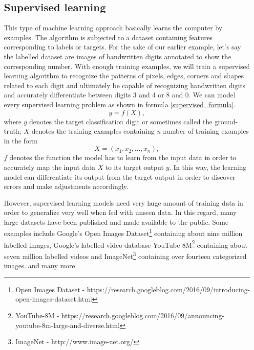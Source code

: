 \documentclass[master]{thesis-uestc}
\begin{document}
\subsection{Supervised learning}
This type of machine learning approach basically learns the computer by examples. The algorithm is subjected to a dataset containing features corresponding to labels or targets. For the sake of our earlier example, let's say the labelled dataset are images of handwritten digits annotated to show the corresponding number. With enough training examples, we will train a supervised learning algorithm to recognize the patterns of pixels, edges, corners and shapes related to each digit and ultimately be capable of recognizing handwritten digits and accurately differentiate between digits 3 and 4 or 8 and 0. We can model every supervised learning problem as shown in formula \ref{supervised_formula}.
\begin{equation}
y = f (X),
\label{supervised_formula}
\end{equation}
where $y$ denotes the target classification digit or sometimes called the ground-truth; $X$ denotes the training examples containing \textit{n} number of training examples in the form
\begin{equation}
X = (x_1, x_2,...,x_n),
\end{equation}
$f$ denotes the function the model has to learn from the input data in order to accurately map the input data $X$ to its target output $y$. In this way, the learning model can differentiate its output from the target output in order to discover errors and make adjustments accordingly.

However, supervised learning models need very huge amount of training data in order to generalize very well when fed with unseen data. In this regard, many large datasets have been published and made available to the public. Some examples include Google's Open Images Dataset\footnote{Open Images Dataset - https://research.googleblog.com/2016/09/introducing-open-images-dataset.html} containing about nine million labelled images, Google's labelled video database YouTube-8M\footnote{YouTube-8M - https://research.googleblog.com/2016/09/announcing-youtube-8m-large-and-diverse.html} containing about seven million labelled videos and ImageNet\footnote{ImageNet - http://www.image-net.org/} containing over fourteen categorized images, and many more.
\end{document}
